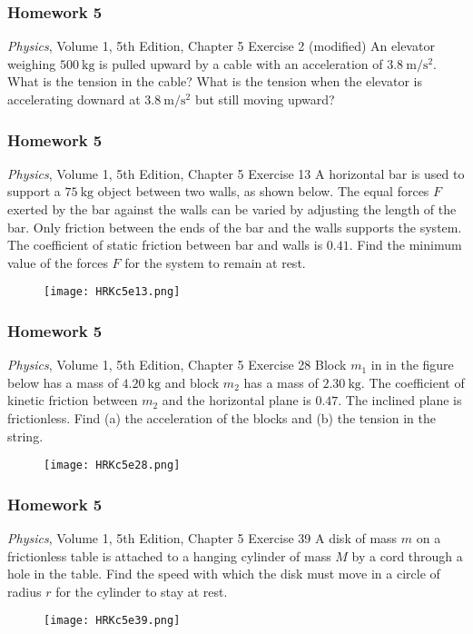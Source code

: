 \documentclass[20pt]{beamer}
\begin{document}
\begin{frame}
	\frametitle{Homework 5}
	\begin{block}{\textit{Physics}, Volume 1, 5th Edition, Chapter 5 Exercise 2 (modified)}
		An elevator weighing $\SI{500}{\kilogram}$ is pulled upward by a cable with an acceleration of $\SI{3.8}{\meter/\second^2}$. What is the tension in the cable? What is the tension when the elevator is accelerating downard at $\SI{3.8}{\meter/\second^2}$ but still moving upward?
	\end{block}
\end{frame}

\begin{frame}
	\frametitle{Homework 5}
	\begin{block}{\textit{Physics}, Volume 1, 5th Edition, Chapter 5 Exercise 13}
		A horizontal bar is used to support a $\SI{75}{\kilogram}$ object between two walls, as shown below. The equal forces $F$ exerted by the bar against the walls can be varied by adjusting the length of the bar. Only friction between the ends of the bar and the walls supports the system. The coefficient of static friction between bar and walls is $0.41$. Find the minimum value of the forces $F$ for the system to remain at rest.
		\begin{figure}[ht]
			\centering
			\texttt{[image: HRKc5e13.png]}
			\label{fig:HRKc5e13}
		\end{figure}
	\end{block}
\end{frame}

\begin{frame}
	\frametitle{Homework 5}
	\begin{block}{\textit{Physics}, Volume 1, 5th Edition, Chapter 5 Exercise 28}
		Block $m_1$ in in the figure below has a mass of $\SI{4.20}{\kilogram}$ and block $m_2$ has a mass of $\SI{2.30}{\kilogram}$. The coefficient of kinetic friction between $m_2$ and the horizontal plane is $0.47$. The inclined plane is frictionless. Find (a) the acceleration of the blocks and (b) the tension in the string.
		\begin{figure}[ht]
			\centering
			\texttt{[image: HRKc5e28.png]}
			\label{fig:HRKc5e28}
		\end{figure}
	\end{block}
\end{frame}

\begin{frame}
	\frametitle{Homework 5}
	\begin{block}{\textit{Physics}, Volume 1, 5th Edition, Chapter 5 Exercise 39}
		A disk of mass $m$ on a frictionless table is attached to a hanging cylinder of mass $M$ by a cord through a hole in the table. Find the speed with which the disk must move in a circle of radius $r$ for the cylinder to stay at rest.
		\begin{figure}[ht]
			\centering
			\texttt{[image: HRKc5e39.png]}
			\label{fig:HRKc5e39}
		\end{figure}
	\end{block}
\end{frame}
\end{document}
